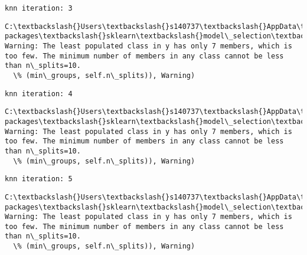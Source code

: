 \documentclass[11pt]{article}
\begin{document}
    \begin{Verbatim}[commandchars=\\\{\}]
knn iteration: 3 

    \end{Verbatim}

    \begin{Verbatim}[commandchars=\\\{\}]
C:\textbackslash{}Users\textbackslash{}s140737\textbackslash{}AppData\textbackslash{}Local\textbackslash{}Continuum\textbackslash{}anaconda3\textbackslash{}lib\textbackslash{}site-packages\textbackslash{}sklearn\textbackslash{}model\_selection\textbackslash{}\_split.py:605: Warning: The least populated class in y has only 7 members, which is too few. The minimum number of members in any class cannot be less than n\_splits=10.
  \% (min\_groups, self.n\_splits)), Warning)

    \end{Verbatim}

    \begin{Verbatim}[commandchars=\\\{\}]
knn iteration: 4 

    \end{Verbatim}

    \begin{Verbatim}[commandchars=\\\{\}]
C:\textbackslash{}Users\textbackslash{}s140737\textbackslash{}AppData\textbackslash{}Local\textbackslash{}Continuum\textbackslash{}anaconda3\textbackslash{}lib\textbackslash{}site-packages\textbackslash{}sklearn\textbackslash{}model\_selection\textbackslash{}\_split.py:605: Warning: The least populated class in y has only 7 members, which is too few. The minimum number of members in any class cannot be less than n\_splits=10.
  \% (min\_groups, self.n\_splits)), Warning)

    \end{Verbatim}

    \begin{Verbatim}[commandchars=\\\{\}]
knn iteration: 5 

    \end{Verbatim}

    \begin{Verbatim}[commandchars=\\\{\}]
C:\textbackslash{}Users\textbackslash{}s140737\textbackslash{}AppData\textbackslash{}Local\textbackslash{}Continuum\textbackslash{}anaconda3\textbackslash{}lib\textbackslash{}site-packages\textbackslash{}sklearn\textbackslash{}model\_selection\textbackslash{}\_split.py:605: Warning: The least populated class in y has only 7 members, which is too few. The minimum number of members in any class cannot be less than n\_splits=10.
  \% (min\_groups, self.n\_splits)), Warning)

    \end{Verbatim}
\end{document}
